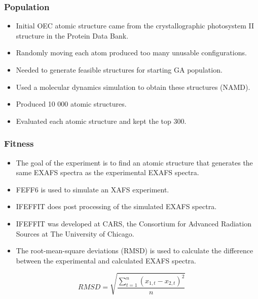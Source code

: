 \documentclass[10pt]{beamer}
\begin{document}
\begin{frame}
	\frametitle{Population}

	\begin{itemize}
		\item Initial OEC atomic structure came from the crystallographic photosystem II structure in the Protein Data Bank.
		\item Randomly moving each atom produced too many unusable configurations.
		\item Needed to generate feasible structures for starting GA population.
		\item Used a molecular dynamics simulation to obtain these structures (NAMD).
		\item Produced 10 000 atomic structures.
		\item Evaluated each atomic structure and kept the top 300.
	\end{itemize}
\end{frame}

\begin{frame}
	\frametitle{Fitness}

	\begin{itemize}
		\item The goal of the experiment is to find an atomic structure that generates the same EXAFS spectra as the experimental EXAFS spectra.
		\item FEFF6 is used to simulate an XAFS experiment.
		\item IFEFFIT does post processing of the simulated EXAFS spectra.
		\item IFEFFIT was developed at CARS, the Consortium for Advanced Radiation Sources at The University of Chicago.
		\item The root-mean-square deviations (RMSD) is used to calculate the difference between the experimental and calculated EXAFS spectra.
	\end{itemize}

	\begin{equation}
		RMSD = \sqrt{\frac{\sum_{t=1}^{n} \left ( x_{1,t}-x_{2,t} \right )^{2}}{n}}
	\end{equation}

\end{frame}
\end{document}
